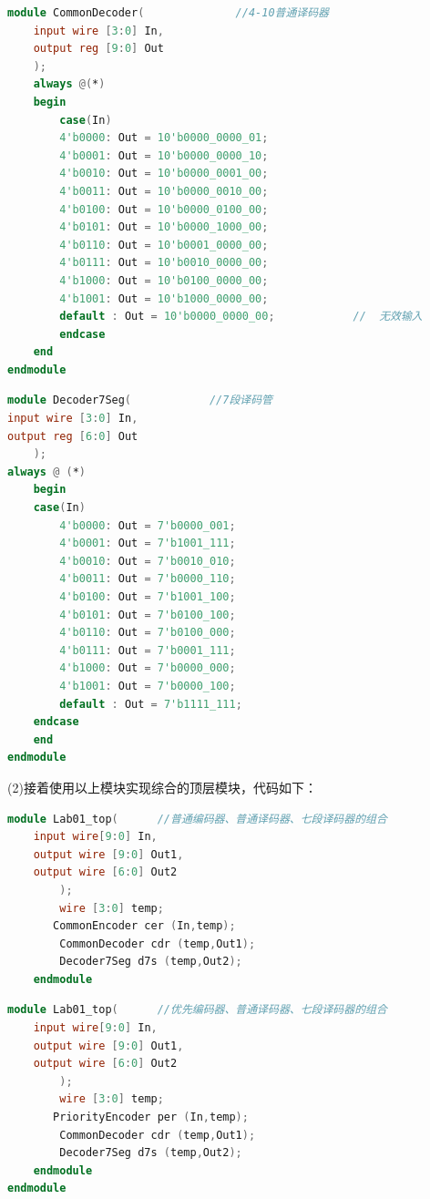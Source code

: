 \documentclass[UTF8,fontset=fandol]{ctexart}
\begin{document}
\begin{lstlisting}[language=Verilog,keywordstyle=\color{red!70}]
    module CommonDecoder(              //4-10普通译码器
    input wire [3:0] In,
    output reg [9:0] Out
    );
    always @(*)
    begin
        case(In)
        4'b0000: Out = 10'b0000_0000_01;
        4'b0001: Out = 10'b0000_0000_10;
        4'b0010: Out = 10'b0000_0001_00;
        4'b0011: Out = 10'b0000_0010_00;
        4'b0100: Out = 10'b0000_0100_00;
        4'b0101: Out = 10'b0000_1000_00;
        4'b0110: Out = 10'b0001_0000_00;
        4'b0111: Out = 10'b0010_0000_00;
        4'b1000: Out = 10'b0100_0000_00;
        4'b1001: Out = 10'b1000_0000_00;
        default : Out = 10'b0000_0000_00;            //  无效输入
        endcase
    end       
endmodule

\end{lstlisting}

\begin{lstlisting}[language=Verilog,keywordstyle=\color{red!70}]
    module Decoder7Seg(            //7段译码管
input wire [3:0] In,
output reg [6:0] Out
    );
always @ (*)
    begin
    case(In)
        4'b0000: Out = 7'b0000_001;
        4'b0001: Out = 7'b1001_111;
        4'b0010: Out = 7'b0010_010;
        4'b0011: Out = 7'b0000_110;
        4'b0100: Out = 7'b1001_100;
        4'b0101: Out = 7'b0100_100;
        4'b0110: Out = 7'b0100_000;
        4'b0111: Out = 7'b0001_111;
        4'b1000: Out = 7'b0000_000;
        4'b1001: Out = 7'b0000_100;
        default : Out = 7'b1111_111;
    endcase
    end       
endmodule
\end{lstlisting}

(2)接着使用以上模块实现综合的顶层模块，代码如下：

\begin{lstlisting}[language=Verilog,keywordstyle=\color{red!70}]
    module Lab01_top(      //普通编码器、普通译码器、七段译码器的组合
    input wire[9:0] In,
    output wire [9:0] Out1,
    output wire [6:0] Out2 
        );
        wire [3:0] temp;
       CommonEncoder cer (In,temp);        
        CommonDecoder cdr (temp,Out1);
        Decoder7Seg d7s (temp,Out2);
    endmodule
\end{lstlisting}

\begin{lstlisting}[language=Verilog,keywordstyle=\color{red!70}]
    module Lab01_top(      //优先编码器、普通译码器、七段译码器的组合
    input wire[9:0] In,
    output wire [9:0] Out1,
    output wire [6:0] Out2 
        );
        wire [3:0] temp;
       PriorityEncoder per (In,temp);        
        CommonDecoder cdr (temp,Out1);
        Decoder7Seg d7s (temp,Out2);
    endmodule    
endmodule
\end{lstlisting}
\end{document}
